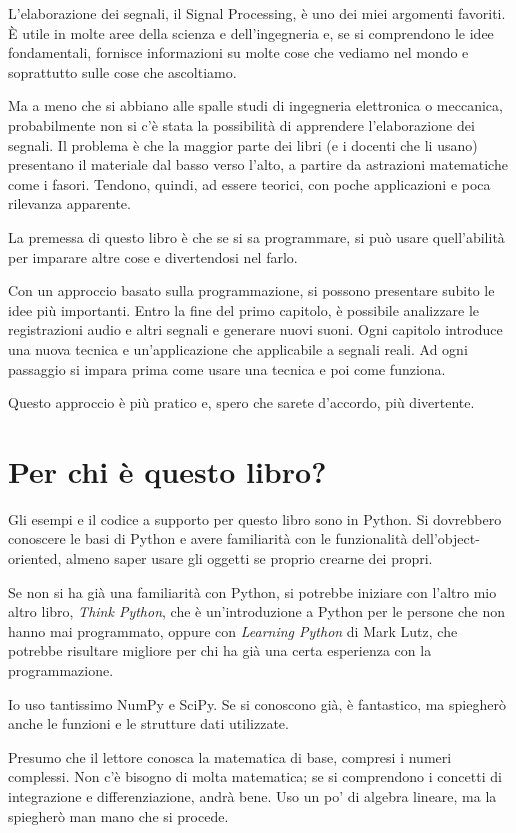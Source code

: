 \documentclass[12pt,a4paper]{book}
\begin{document}
L'elaborazione dei segnali, il Signal Processing, è uno dei miei argomenti favoriti. È utile in molte aree della scienza e dell'ingegneria e, se si comprendono le idee fondamentali, fornisce informazioni su molte cose che vediamo nel mondo e soprattutto sulle cose che ascoltiamo.

Ma a meno che si abbiano alle spalle studi di ingegneria elettronica o meccanica, probabilmente non si c'è stata la possibilità di apprendere l'elaborazione dei segnali. Il problema è che la maggior parte dei libri (e i docenti che li usano) presentano il materiale dal basso verso l'alto, a partire da astrazioni matematiche come i fasori. Tendono, quindi, ad essere teorici, con poche applicazioni e poca rilevanza apparente.

La premessa di questo libro è che se si sa programmare, si può usare quell'abilità per imparare altre cose e divertendosi nel farlo.

Con un approccio basato sulla programmazione, si possono presentare subito le idee più importanti. Entro la fine del primo capitolo, è possibile analizzare le registrazioni audio e altri segnali e generare nuovi suoni. Ogni capitolo introduce una nuova tecnica e un'applicazione che applicabile a segnali reali. Ad ogni passaggio si impara prima come usare una tecnica e poi come funziona.

Questo approccio è più pratico e, spero che sarete d'accordo, più divertente.

\section{Per chi è questo libro?} 

Gli esempi e il codice a supporto per questo libro sono in Python. Si dovrebbero conoscere le basi di Python e avere familiarità con le funzionalità dell'object-oriented, almeno saper usare gli oggetti se proprio crearne dei propri.

Se non si ha già una familiarità con Python, si potrebbe iniziare con l'altro mio altro libro, {\it Think Python}, che è un'introduzione a Python per le persone che non hanno mai programmato, oppure con {\it Learning Python} di Mark Lutz, che potrebbe risultare migliore per chi ha già una certa esperienza con la programmazione.

Io uso tantissimo NumPy e SciPy. Se si conoscono già, è fantastico, ma spiegherò anche le funzioni e le strutture dati utilizzate.

Presumo che il lettore conosca la matematica di base, compresi i numeri complessi. Non c'è bisogno di molta matematica; se si comprendono i concetti di integrazione e differenziazione, andrà bene. Uso un po' di algebra lineare, ma la spiegherò man mano che si procede.
\end{document}
